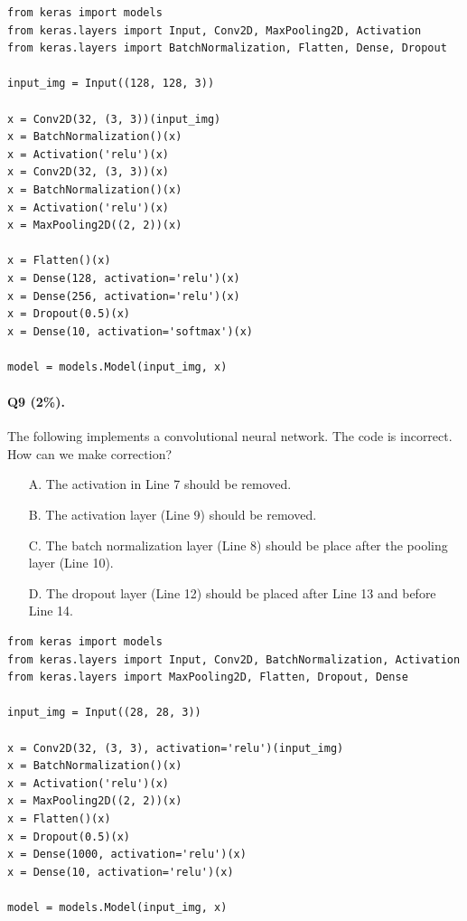 \documentclass[11pt]{article}
\numberwithin{equation}{section}
\begin{document}
\begin{lstlisting}
from keras import models
from keras.layers import Input, Conv2D, MaxPooling2D, Activation
from keras.layers import BatchNormalization, Flatten, Dense, Dropout

input_img = Input((128, 128, 3))

x = Conv2D(32, (3, 3))(input_img)
x = BatchNormalization()(x)
x = Activation('relu')(x)
x = Conv2D(32, (3, 3))(x)
x = BatchNormalization()(x)
x = Activation('relu')(x)
x = MaxPooling2D((2, 2))(x)

x = Flatten()(x)
x = Dense(128, activation='relu')(x)
x = Dense(256, activation='relu')(x)
x = Dropout(0.5)(x)
x = Dense(10, activation='softmax')(x)

model = models.Model(input_img, x)
\end{lstlisting}
\vspace{3mm}


\paragraph{Q9 (2\%).} 
The following implements a convolutional neural network.
The code is incorrect.
How can we make correction?
\begin{itemize}
	\item[A.]
	The activation in Line 7 should be removed.
	\item[B.]
	The activation layer (Line 9) should be removed.
	\item[C.]
	The batch normalization layer (Line 8) should be place after the pooling layer (Line 10).
	\item[D.]
	The dropout layer (Line 12) should be placed after Line 13 and before Line 14.
\end{itemize}


\begin{lstlisting}
from keras import models
from keras.layers import Input, Conv2D, BatchNormalization, Activation
from keras.layers import MaxPooling2D, Flatten, Dropout, Dense

input_img = Input((28, 28, 3))

x = Conv2D(32, (3, 3), activation='relu')(input_img)
x = BatchNormalization()(x)
x = Activation('relu')(x)
x = MaxPooling2D((2, 2))(x)
x = Flatten()(x)
x = Dropout(0.5)(x)
x = Dense(1000, activation='relu')(x)
x = Dense(10, activation='relu')(x)

model = models.Model(input_img, x)
\end{lstlisting}
\vspace{3mm}
\end{document}
